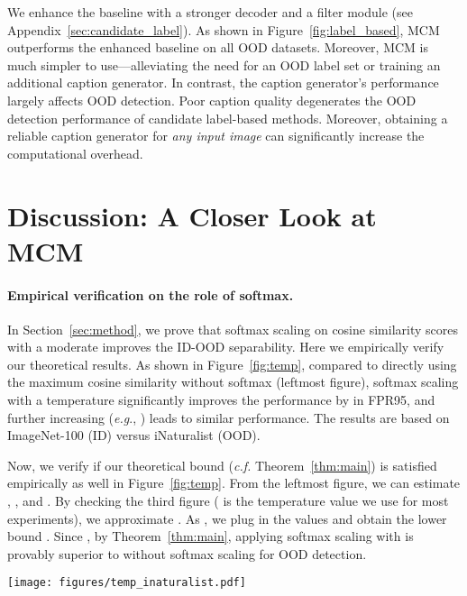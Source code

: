 \documentclass{article}
\def\eg{\emph{e.g}., }
\begin{document}
We enhance the baseline with a stronger decoder and a filter module (see Appendix~\ref{sec:candidate_label}).
As shown in Figure~\ref{fig:label_based}, MCM outperforms the enhanced baseline on all OOD datasets. Moreover, MCM is much simpler to use---alleviating the need for an OOD label set or training {an} additional caption generator.
{In contrast, the caption generator's performance largely affects OOD detection. Poor caption quality degenerates the OOD detection performance of candidate label-based methods. Moreover, obtaining a reliable {caption generator} for \emph{any input image} can significantly increase the computational overhead.}


\section{Discussion: A Closer Look at MCM} 
\label{sec:closer}
\paragraph{Empirical verification on the role of softmax.} In Section~\ref{sec:method}, we prove that softmax scaling on cosine similarity scores with a moderate  improves the ID-OOD separability. Here we empirically verify our theoretical results. As shown in Figure~\ref{fig:temp}, compared to directly using the maximum cosine similarity without softmax (leftmost figure), softmax scaling with a temperature  significantly improves the performance by  in FPR95, and further increasing  (\eg ) leads to similar performance. The results are based on ImageNet-100 (ID) versus iNaturalist (OOD).

Now, we verify if our theoretical bound (\emph{c.f.} Theorem~\ref{thm:main}) is satisfied empirically as well in Figure~\ref{fig:temp}. From the leftmost figure, we can estimate , , and . By checking the third figure ( is the temperature value we use for most experiments), we approximate . As , we plug in the values and obtain the lower bound . Since , by Theorem~\ref{thm:main}, applying softmax scaling with  is provably superior to without softmax scaling for OOD detection. 


\begin{figure*}[t]
  \centering
    \texttt{[image: figures/temp\_inaturalist.pdf]}
    \vspace{-0.2cm}
\caption{The influence of softmax scaling and temperature. We use ImgeNet-100 (ID) vs. iNaturalist (OOD). Softmax scaling with a moderate temperature significantly improves FPR95.}
\label{fig:temp}
\vspace{-3mm}
\end{figure*}
\end{document}
